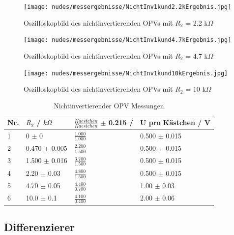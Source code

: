 \documentclass[12pt,a4paper,twoside]{article}
\begin{document}
\begin{figure}[H]
    \centering
    \texttt{[image: nudes/messergebnisse/NichtInv1kund2.2kErgebnis.jpg]}
    \caption{Oszilloskopbild des nichtinvertierenden OPVs mit $R_{2}$ = 2.2 k$\Omega$}
    \label{fig:Nichtinvertierender1k2.2kOszibild}
\end{figure}

\begin{figure}[H]
    \centering
    \texttt{[image: nudes/messergebnisse/NichtInv1kund4.7kErgebnis.jpg]}
    \caption{Oszilloskopbild des nichtinvertierenden OPVs mit $R_{2}$ = 4.7 k$\Omega$}
    \label{fig:Nichtinvertierender1k4.7kOszibild}
\end{figure}

\begin{figure}[H]
    \centering
    \texttt{[image: nudes/messergebnisse/NichtInv1kund10kErgebnis.jpg]}
    \caption{Oszilloskopbild des nichtinvertierenden OPVs mit $R_{2}$ = 10 k$\Omega$}
    \label{fig:Nichtinvertierender1k10kOszibild}
\end{figure}

\begin{table}[H]
    \centering
    \caption{Nichtinvertierender OPV Messungen}
    \label{tab:NioVerstärkungenGemessen}
    \begin{tabular}{| l | l | l | l |}
        \hline
        Nr. & $R_{2}$ / $k \Omega$ & $\frac{Kaestchen}{Kaestchen}$ $\pm$ 0.215 / & U pro Kästchen / V \\
        \hline
        1 &  0 $\pm$ 0 & $\frac{1.000}{1.000}$ & 0.500 $\pm$ 0.015 \\
        2 &  0.470 $\pm$ 0.005 & $\frac{2.200}{1.500}$ & 0.500 $\pm$ 0.015 \\
        3 &  1.500 $\pm$ 0.016 & $\frac{3.700}{1.500}$ & 0.500 $\pm$ 0.015 \\
        4 &  2.20 $\pm$  0.03  & $\frac{4.800}{1.500}$ & 0.500 $\pm$ 0.015 \\
        5 &  4.70 $\pm$  0.05  & $\frac{4.400}{0.700}$ & 1.00 $\pm$ 0.03 \\
        6 &  10.0 $\pm$  0.1   & $\frac{4.100}{0.400}$ & 2.00 $\pm$ 0.06 \\
        \hline
    \end{tabular}
\end{table}


\subsection{Differenzierer}
\end{document}
